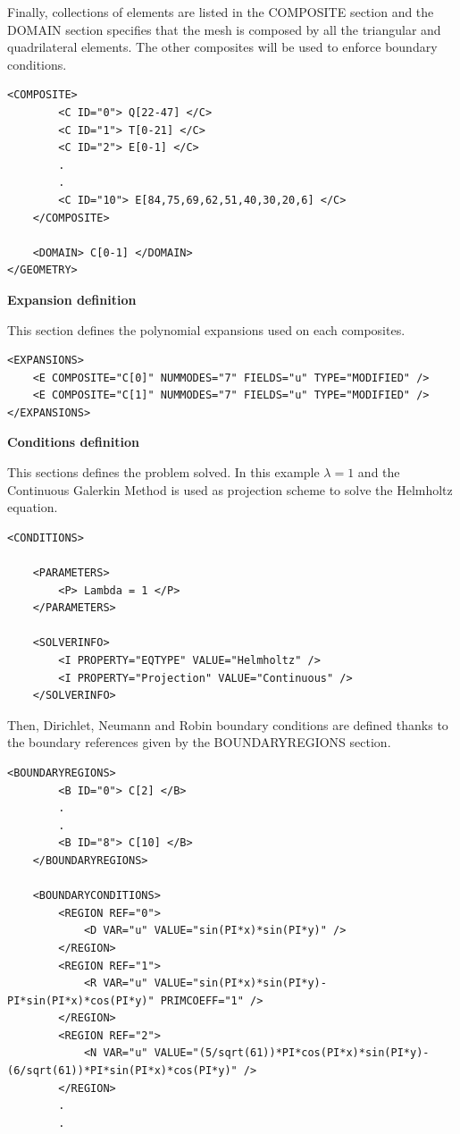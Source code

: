 Finally, collections of elements are listed in the COMPOSITE section and the DOMAIN section specifies that 
the mesh is composed by all the triangular and quadrilateral elements. The other composites will be used to enforce boundary conditions.

\begin{lstlisting}[style=XMLStyle]
 <COMPOSITE>
        <C ID="0"> Q[22-47] </C>
        <C ID="1"> T[0-21] </C>
        <C ID="2"> E[0-1] </C>
        .
        .
        <C ID="10"> E[84,75,69,62,51,40,30,20,6] </C>
    </COMPOSITE>

    <DOMAIN> C[0-1] </DOMAIN>
</GEOMETRY>
\end{lstlisting}

\textbf{\footnotesize{Expansion definition}}

This section defines the polynomial expansions used on each composites.

\begin{lstlisting}[style=XMLStyle]
<EXPANSIONS>
    <E COMPOSITE="C[0]" NUMMODES="7" FIELDS="u" TYPE="MODIFIED" />
    <E COMPOSITE="C[1]" NUMMODES="7" FIELDS="u" TYPE="MODIFIED" />
</EXPANSIONS>
\end{lstlisting}

\textbf{\footnotesize{Conditions definition}}

This sections defines the problem solved. In this example $\lambda = 1$ and the Continuous Galerkin Method
is used as projection scheme to solve the Helmholtz equation.

\begin{lstlisting}[style=XMLStyle]
<CONDITIONS>

    <PARAMETERS>
        <P> Lambda = 1 </P>
    </PARAMETERS>

    <SOLVERINFO>
        <I PROPERTY="EQTYPE" VALUE="Helmholtz" />
        <I PROPERTY="Projection" VALUE="Continuous" />
    </SOLVERINFO>
\end{lstlisting}

Then, Dirichlet, Neumann and Robin boundary conditions are defined thanks to 
the boundary references given by the BOUNDARYREGIONS section.

\begin{lstlisting}[style=XMLStyle]
<BOUNDARYREGIONS>
        <B ID="0"> C[2] </B>
        .
        .
        <B ID="8"> C[10] </B>
    </BOUNDARYREGIONS>

    <BOUNDARYCONDITIONS>
        <REGION REF="0">
            <D VAR="u" VALUE="sin(PI*x)*sin(PI*y)" />
        </REGION>
        <REGION REF="1">
            <R VAR="u" VALUE="sin(PI*x)*sin(PI*y)-PI*sin(PI*x)*cos(PI*y)" PRIMCOEFF="1" />
        </REGION>
        <REGION REF="2">
            <N VAR="u" VALUE="(5/sqrt(61))*PI*cos(PI*x)*sin(PI*y)-(6/sqrt(61))*PI*sin(PI*x)*cos(PI*y)" />
        </REGION>
        .
        .
\end{lstlisting}

